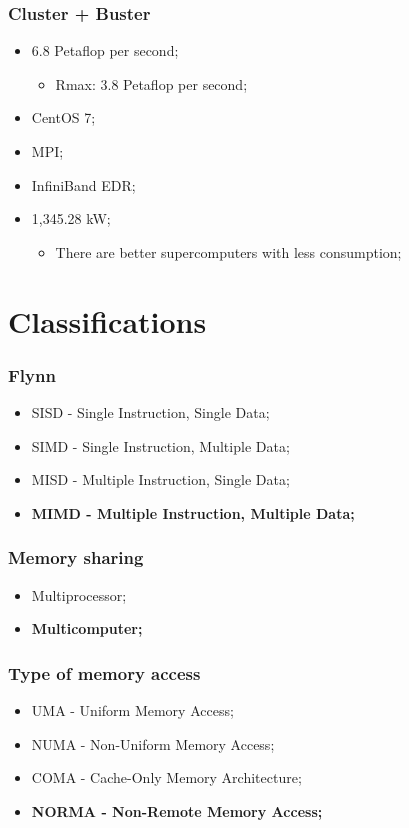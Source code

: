 \documentclass{beamer}
\begin{document}
\begin{frame}
  \frametitle{Cluster + Buster}
  \begin{itemize}
    \item 6.8 Petaflop per second;
    \begin{itemize}
      \item Rmax: 3.8 Petaflop per second;
    \end{itemize}
    \item CentOS 7;
    \item MPI;
    \item InfiniBand EDR;
    \item 1,345.28 kW;
    \begin{itemize}
      \item There are better supercomputers with less consumption;
    \end{itemize}

  \end{itemize}
\end{frame}


\section{Classifications}

\begin{frame}
  \frametitle{Flynn}
  \begin{itemize}
    \item SISD - Single Instruction, Single Data;
    \item SIMD - Single Instruction, Multiple Data;
    \item MISD - Multiple Instruction, Single Data;
    \item \textbf{MIMD - Multiple Instruction, Multiple Data;}
  \end{itemize}
\end{frame}

\begin{frame}
  \frametitle{Memory sharing}
  \begin{itemize}
    \item Multiprocessor;
    \item \textbf{Multicomputer;}
  \end{itemize}

\end{frame}

\begin{frame}
  \frametitle{Type of memory access}
  \begin{itemize}
    \item UMA - Uniform Memory Access;
    \item NUMA - Non-Uniform Memory Access;
    \item COMA - Cache-Only Memory Architecture;
    \item \textbf{NORMA - Non-Remote Memory Access;}
  \end{itemize}

\end{frame}
\end{document}
